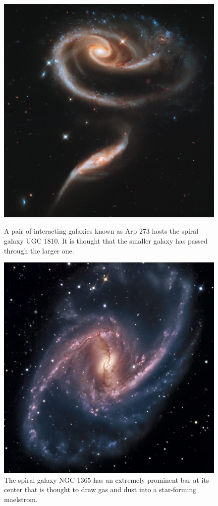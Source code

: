 \documentclass[12pt, oneside]{smuthesis}
\begin{document}
\begin{figure}[H]
	\centering
	\begin{minipage}{0.48\textwidth}
		\centering
		\includegraphics[width=0.9\linewidth]{Arp273}
		\caption{A pair of interacting galaxies known as Arp 273 hosts the spiral galaxy UGC 1810. It is thought that the smaller galaxy has passed through the larger one.}
		\label{fig:Arp273}
	\end{minipage}
	\begin{minipage}{0.04\textwidth}
		\centering
	\end{minipage}
	\begin{minipage}{0.48\textwidth}
		\centering
		\includegraphics[width=0.9\linewidth]{NGC1365}
		\caption{The spiral galaxy NGC 1365 has an extremely prominent bar at its center that is thought to draw gas and dust into a star-forming maelstrom.}
		\label{fig:NGC1365}
	\end{minipage}
\end{figure}
\end{document}
